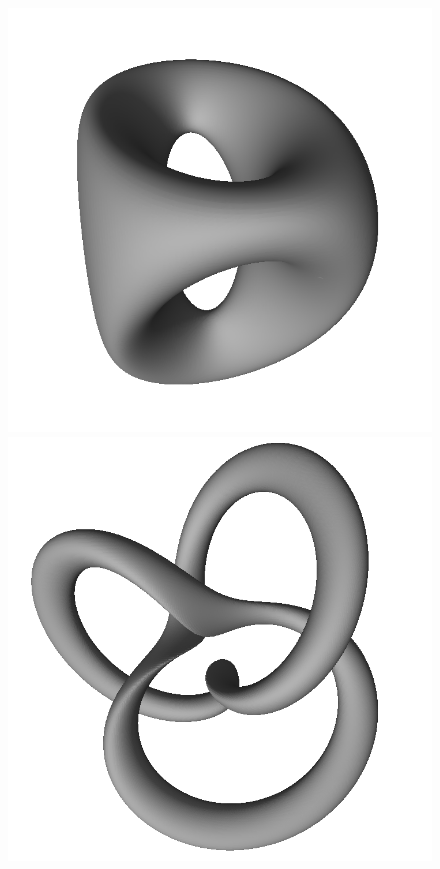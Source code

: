 \documentclass[11pt,twocolumn]{article}
\begin{document}
\begin{figure}
{				\includegraphics{gen2.png}
			}
			\resizebox{0.5\textwidth}{!}
			{
				\includegraphics{knot.png}
}
\end{figure}
\end{document}
